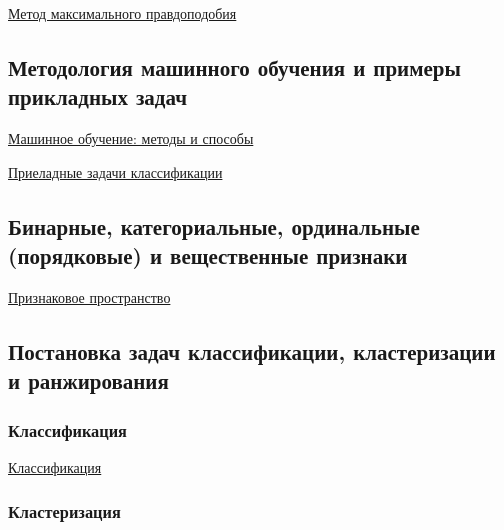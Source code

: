 \documentclass{article}
\begin{document}
\href{https://ru.wikipedia.org/wiki/%D0%9C%D0%B5%D1%82%D0%BE%D0%B4_%D0%BC%D0%B0%D0%BA%D1%81%D0%B8%D0%BC%D0%B0%D0%BB%D1%8C%D0%BD%D0%BE%D0%B3%D0%BE_%D0%BF%D1%80%D0%B0%D0%B2%D0%B4%D0%BE%D0%BF%D0%BE%D0%B4%D0%BE%D0%B1%D0%B8%D1%8F}{Метод максимального правдоподобия}

\subsection{Методология машинного обучения и примеры прикладных задач}

\href{https://www.osp.ru/cio/2018/05/13054535}{Машинное обучение: методы и способы}

\href{http://www.machinelearning.ru/wiki/index.php?title=%D0%9A%D0%BB%D0%B0%D1%81%D1%81%D0%B8%D1%84%D0%B8%D0%BA%D0%B0%D1%86%D0%B8%D1%8F}{Приеладные задачи классификации}

\subsection{Бинарные, категориальные, ординальные (порядковые) и вещественные признаки}

\href{http://www.machinelearning.ru/wiki/index.php?title=%D0%9A%D0%BB%D0%B0%D1%81%D1%81%D0%B8%D1%84%D0%B8%D0%BA%D0%B0%D1%86%D0%B8%D1%8F}{Признаковое пространство}

\subsection{Постановка задач классификации, кластеризации и ранжирования}

\subsubsection{Классификация}

\href{http://www.machinelearning.ru/wiki/index.php?title=%D0%9A%D0%BB%D0%B0%D1%81%D1%81%D0%B8%D1%84%D0%B8%D0%BA%D0%B0%D1%86%D0%B8%D1%8F#:~:text=%D0%9A%D0%BB%D0%B0%D1%81%D1%81%D0%B8%D1%84%D0%B8%D0%BA%D0%B0%D1%86%D0%B8%D1%8F%20%E2%80%94%20%D0%BE%D0%B4%D0%B8%D0%BD%20%D0%B8%D0%B7%20%D1%80%D0%B0%D0%B7%D0%B4%D0%B5%D0%BB%D0%BE%D0%B2%20%D0%BC%D0%B0%D1%88%D0%B8%D0%BD%D0%BD%D0%BE%D0%B3%D0%BE,%D0%AD%D1%82%D0%BE%20%D0%BC%D0%BD%D0%BE%D0%B6%D0%B5%D1%81%D1%82%D0%B2%D0%BE%20%D0%BD%D0%B0%D0%B7%D1%8B%D0%B2%D0%B0%D0%B5%D1%82%D1%81%D1%8F%20%D0%BE%D0%B1%D1%83%D1%87%D0%B0%D1%8E%D1%89%D0%B5%D0%B9%20%D0%B2%D1%8B%D0%B1%D0%BE%D1%80%D0%BA%D0%BE%D0%B9}{Классификация}
\subsubsection{Кластеризация}
\end{document}
